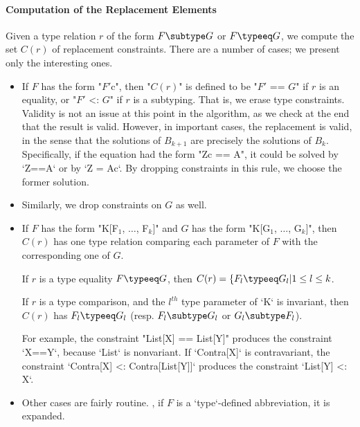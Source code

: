 {\paragraph{Computation of the Replacement Elements}

Given a type relation
{$r$} of the form {$F \subtype G$}
or {$F \typeeq G$}, we compute the set {$C(r)$} of
replacement constraints.  There are a number of cases; we present only the
interesting ones. 

\begin{itemize}
\item If $F$ has the form \xcdmath"$F'${c}", then  
\xcdmath"$C(r)$" is defined to be
 \xcdmath"$F'$ == $G$" if $r$ is an equality, or 
 \xcdmath"$F'$ <: $G$" if {$r$} is a subtyping.
That is, we erase type constraints.  
Validity is not an issue at this point in the algorithm, as 
we check at the end that the result is valid.
However, in important cases, the replacement is valid, in the sense that the 
solutions of {$B_{k+1}$} are precisely the solutions of {$B_k$}.
Specifically, if the equation had the form \xcdmath"Z{c} == A", it could be
solved by \xcd`Z==A` or by \xcd`Z = A{c}`.  By dropping constraints in this
rule, we choose the former solution. 

\item Similarly, we drop constraints on {$G$} as well.

\item If {$F$} has the form \xcdmath"K[F$_1$, $\ldots$, F$_k$]"
and 
{$G$}
has the form \xcdmath"K[G$_1$, $\ldots$, G$_k$]", 
then {$C(r)$} has one type relation comparing each parameter of 
{$F$} with the corresponding one of {$G$}. 

If {$r$} is a type equality {$F \typeeq G$}, then 
{$C(r) = \{ F_l \typeeq G_l | 1 \le l \le k$}.

If {$r$} is a type comparison, and the {$l^{th}$} type parameter of \xcd`K` is
invariant,
then 
{$C(r)$} has {$F_l \typeeq G_l$}
(resp. {$F_l \subtype G_l$} or {$G_l \subtype F_l $}). 


For example, the constraint \xcdmath"List[X] == List[Y]" produces the
constraint \xcd`X==Y`, because \xcd`List` is nonvariant.  
If \xcd`Contra[X]` is contravariant, 
the constraint \xcd`Contra[X] <: Contra[List[Y]]` 
produces the constraint \xcd`List[Y] <: X`.  

\item Other cases are fairly routine.  \Eg, if {$F$} is a \xcd`type`-defined
      abbreviation, it is expanded.


\end{itemize}}
